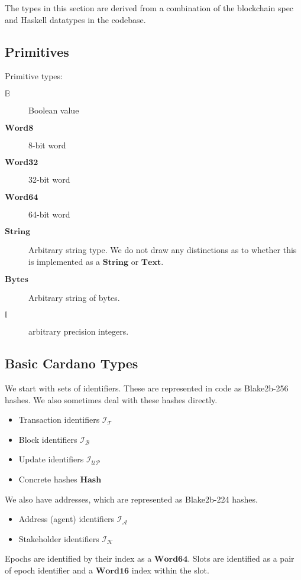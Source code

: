 \documentclass{article}
\newcommand{\idsof}[1]{\mathcal{I}\!_#1}
\newcommand{\txids}{\idsof{\txs}}
\newcommand{\blockids}{\idsof{\blocks}}
\newcommand{\agentids}{\idsof{\agents}}
\newcommand{\updids}{\idsof{\mathcal{UP}}}
\newcommand{\stakeholderids}{\idsof{\mathcal{K}}}
\newcommand{\agents}{\mathcal{A}}
\newcommand{\txs}{\mathcal{T}}
\newcommand{\blocks}{\mathcal{B}}
\newcommand{\hstype}[1]{\textbf{#1}}
\newcommand{\String}{\hstype{String}}
\newcommand{\Word}[1]{\hstype{Word#1}}
\newcommand{\hash}{\hstype{Hash}}
\newcommand{\Integer}{\mathbb{I}}
\newcommand{\Bool}{\mathbb{B}}
\newcommand{\Bytes}{\hstype{Bytes}}
\begin{document}
The types in this section are derived from a combination of the blockchain spec
and Haskell datatypes in the codebase.

\subsection{Primitives}

Primitive types:

\begin{description}
\item [$\Bool$] Boolean value
\item [$\Word{8}$] 8-bit word
\item [$\Word{32}$] 32-bit word
\item [$\Word{64}$] 64-bit word
\item [$\String$] Arbitrary string type. We do not draw any distinctions as to
  whether this is implemented as a $\hstype{String}$ or $\hstype{Text}$.
\item [$\Bytes$] Arbitrary string of bytes.
\item [$\Integer$] arbitrary precision integers.
\end{description}

\subsection{Basic Cardano Types}

We start with sets of identifiers. These are represented in code as Blake2b-256
hashes. We also sometimes deal with these hashes directly.

\begin{itemize}
\item{Transaction identifiers $\txids$}
\item{Block identifiers $\blockids$}
\item Update identifiers $\updids$
\item Concrete hashes $\hash$
\end{itemize}

We also have addresses, which are represented as Blake2b-224 hashes.

\begin{itemize}
\item{Address (agent) identifiers $\agentids$}
\item Stakeholder identifiers $\stakeholderids$
\end{itemize}

Epochs are identified by their index as a $\Word{64}$. Slots are identified as a
pair of epoch identifier and a $\Word{16}$ index within the slot.
\end{document}

